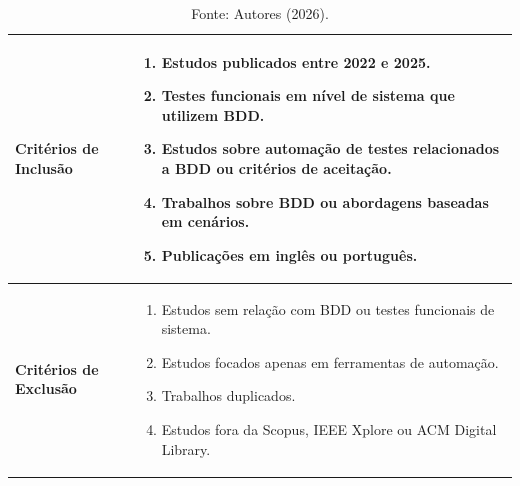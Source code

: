 \begin{table}
\centering
\caption{Critérios de Inclusão e Exclusão}
\label{tab:criterios}
\begin{tabular}{|p{4cm}|p{11cm}|}
\hline
\textbf{Critérios de Inclusão} &
\begin{enumerate}
    \item Estudos publicados entre 2022 e 2025.
    \item Testes funcionais em nível de sistema que utilizem BDD.
    \item Estudos sobre automação de testes relacionados a BDD ou critérios de aceitação.
    \item Trabalhos sobre BDD ou abordagens baseadas em cenários.
    \item Publicações em inglês ou português.
\end{enumerate}
\\ \hline

\textbf{Critérios de Exclusão} &
\begin{enumerate}
    \item Estudos sem relação com BDD ou testes funcionais de sistema.
    \item Estudos focados apenas em ferramentas de automação.
    \item Trabalhos duplicados.
    \item Estudos fora da Scopus, IEEE Xplore ou ACM Digital Library.
\end{enumerate}
\\ \hline
\end{tabular}
\begin{center}\caption*{Fonte: Autores (2026).}\end{center}
\end{table}


